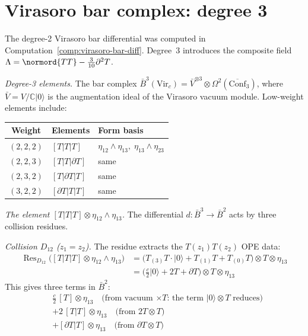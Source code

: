 \section{Virasoro bar complex: degree 3}
\label{sec:virasoro-degree3-details}

The degree-2 Virasoro bar differential was computed in
Computation~\ref{comp:virasoro-bar-diff}. Degree~3 introduces
the composite field $\Lambda = \normord{TT} -
\frac{3}{10}\partial^2 T$.

\begin{computation}
\label{comp:virasoro-degree3}

\emph{Degree-3 elements.}
The bar complex $\bar{B}^3(\mathrm{Vir}_c) = \bar{V}^{\otimes 3}
\otimes \Omega^2(\overline{\mathrm{Conf}}_3)$, where
$\bar{V} = V/\mathbb{C}|0\rangle$ is the augmentation ideal
of the Virasoro vacuum module. Low-weight elements include:
\begin{center}
\renewcommand{\arraystretch}{1.2}
\begin{tabular}{cll}
\textbf{Weight} & \textbf{Elements} & \textbf{Form basis} \\
\hline
$(2,2,2)$ & $[T|T|T]$ & $\eta_{12}\wedge\eta_{13},\;\eta_{13}\wedge\eta_{23}$ \\
$(2,2,3)$ & $[T|T|\partial T]$ & same \\
$(2,3,2)$ & $[T|\partial T|T]$ & same \\
$(3,2,2)$ & $[\partial T|T|T]$ & same
\end{tabular}
\end{center}

\emph{The element $[T|T|T] \otimes \eta_{12}\wedge\eta_{13}$.}
The differential $d\colon \bar{B}^3 \to \bar{B}^2$ acts by three
collision residues.

\emph{Collision $D_{12}$ ($z_1 = z_2$).}
The residue extracts the $T(z_1)T(z_2)$ OPE data:
\begin{align*}
\operatorname{Res}_{D_{12}}\bigl([T|T|T] \otimes \eta_{12}\wedge\eta_{13}\bigr)
&= \bigl(T_{(3)}T \cdot |0\rangle + T_{(1)}T + T_{(0)}T\bigr) \otimes T
\otimes \eta_{13} \\
&= \bigl(\tfrac{c}{2}|0\rangle + 2T + \partial T\bigr)
\otimes T \otimes \eta_{13}
\end{align*}
This gives three terms in $\bar{B}^2$:
\begin{align*}
&\frac{c}{2}\,[T] \otimes \eta_{13}
\quad\text{(from vacuum $\times T$: the term $|0\rangle \otimes T$ reduces)} \\
&+ 2\,[T|T] \otimes \eta_{13}
\quad\text{(from $2T \otimes T$)} \\
&+ [\partial T|T] \otimes \eta_{13}
\quad\text{(from $\partial T \otimes T$)}
\end{align*}


\end{computation}
